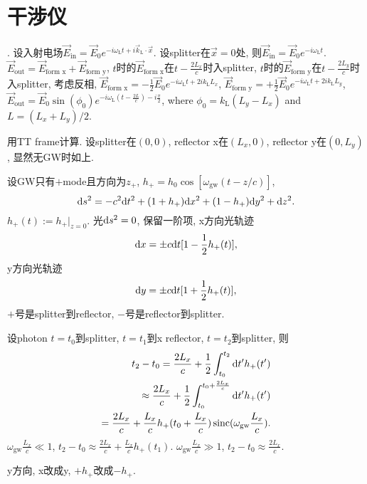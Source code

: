 \chapter{干涉仪}

\cite{Maggiore2014}. 设入射电场$\vec{E}_\text{in}=\vec{E}_0e^{-i\omega_\text{L}t+i\vec{k}_\text{L}\cdot\vec{x}}$. 设splitter在$\vec{x}=0$处, 则$\vec{E}_\text{in}=\vec{E}_0e^{-i\omega_\text{L}t}$. $\vec{E}_\text{out}=\vec{E}_\text{form x}+\vec{E}_\text{form y}$, $t$时的$\vec{E}_\text{form x}$在$t-\frac{2L_x}{c}$时入splitter, $t$时的$\vec{E}_\text{form y}$在$t-\frac{2L_y}{c}$时入splitter, 考虑反相, $\vec{E}_\text{form x}=-\frac{1}{2}\vec{E}_0e^{-i\omega_\text{L}t+2ik_\text{L}L_x}$, $\vec{E}_\text{form y}=+\frac{1}{2}\vec{E}_0e^{-i\omega_\text{L}t+2ik_\text{L}L_y}$, $\vec{E}_\text{out}=\vec{E}_0\sin(\phi_0)e^{-i\omega_\text{L}(t-\frac{2L}{c})-i\frac{\pi}{2}}$, where $\phi_0=k_\text{L}(L_y-L_x)$ and $L=(L_x+L_y)/2$.

用TT frame计算. 设splitter在$(0,0)$, reflector x在$(L_x,0)$, reflector y在$(0,L_y)$, 显然无GW时如上.

设GW只有$+$mode且方向为$z_+$, $h_+=h_0\cos[\omega_\text{gw}(t-z/c)]$, 
\begin{equation}
    \mathrm{d} s^2=-c^2\mathrm{d} t^2+(1 +h_+)\mathrm{d} x^2+ (1-h_+)\mathrm{d} y^2+\mathrm{d} z^2.
\end{equation}
$h_+(t):=h_+|_{z=0}$. 光$\mathrm{d} s^2=0$, 保留一阶项, x方向光轨迹
\begin{equation}
    \mathrm{d} x=\pm c\mathrm{d} t[1-\frac{1}{2}h_+(t)],
\end{equation}
y方向光轨迹
\begin{equation}
    \mathrm{d} y=\pm c\mathrm{d} t[1+\frac{1}{2}h_+(t)],
\end{equation}
$+$号是splitter到reflector, $-$号是reflector到splitter.

设photon $t=t_0$到splitter, $t=t_1$到x reflector, $t=t_2$到splitter, 则
\begin{eqnarray}
    t_2-t_0=\frac{2L_x}{c}+\frac{1}{2}\int^{t_2}_{t_0}\mathrm{d} t'h_+(t')\\
    \approx\frac{2L_x}{c}+\frac{1}{2}\int^{t_0+\frac{2L_x}{c}}_{t_0}\mathrm{d} t'h_+(t')\\
    =\frac{2L_x}{c}+\frac{L_x}{c}h_+(t_0+\frac{L_x}{c})\operatorname{sinc}(\omega_\text{gw}\frac{L_x}{c}).
\end{eqnarray}
$\omega_\text{gw}\frac{L_x}{c}\ll1$, $t_2-t_0\approx\frac{2L_x}{c}+\frac{L_x}{c}h_+(t_1)$. $\omega_\text{gw}\frac{L_x}{c}\gg1$, $t_2-t_0\approx\frac{2L_x}{c}$.

y方向, x改成y, $+h_+$改成$-h_+$.


